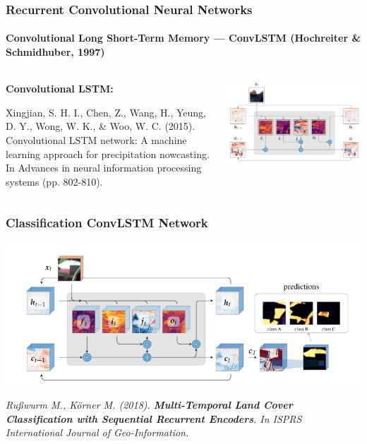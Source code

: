 \begin{frame}[t]
\frametitle{Recurrent Convolutional Neural Networks}
\framesubtitle{Convolutional Long Short-Term Memory --- ConvLSTM (Hochreiter \& Schmidhuber, 1997)}
\begin{columns}
	\begin{column}{0.3\textwidth}
		
		
		\textbf{Convolutional LSTM:}
		
		\vspace{2em}
		{\scriptsize
			Xingjian, S. H. I., Chen, Z., Wang, H., Yeung, D. Y., Wong, W. K., \& Woo, W. C. (2015). Convolutional LSTM network: A machine learning approach for precipitation nowcasting. In Advances in neural information processing systems (pp. 802-810). \par
		}
		
	\end{column}
	\vspace{-2em}	
	\begin{column}{0.7\textwidth}
		
		\includegraphics[width=\textwidth]{images/convlstm}	
	\end{column}
\end{columns}



\end{frame}

\begin{frame}
\frametitle{Classification ConvLSTM Network}

\centering\includegraphics[width=.8\textwidth]{images/lstm}

	\small
\textsl{
	Rußwurm M., Körner M. (2018). \textbf{Multi-Temporal Land Cover Classification with Sequential Recurrent Encoders}. In ISPRS International Journal of Geo-Information. 
}

\end{frame}


